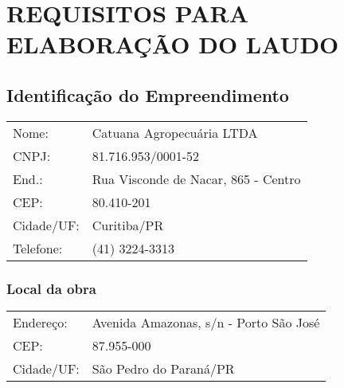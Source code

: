 \chapter{REQUISITOS PARA ELABORAÇÃO DO LAUDO}

\section{Identificação do Empreendimento}

\begin{tabular}{ll}
Nome: & Catuana Agropecuária LTDA\\
CNPJ: & 81.716.953/0001-52\\
End.: & Rua Visconde de Nacar, 865 - Centro\\
CEP:  & 80.410-201\\
Cidade/UF:  & Curitiba/PR\\
Telefone: & (41) 3224-3313\\
\end{tabular}


\subsection*{Local da obra}

\begin{tabularx}{\textwidth}{lX}
Endereço:  & Avenida Amazonas, s/n - Porto São José\\
CEP:  & 87.955-000\\
Cidade/UF:  & São Pedro do Paraná/PR \\
\end{tabularx}
